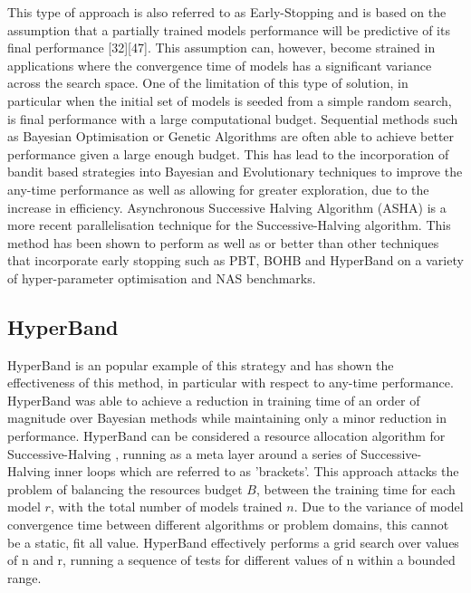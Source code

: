 \documentclass{article}
\begin{document}
		This type of approach is also referred to as Early-Stopping and is based on the assumption that a partially trained models performance will be predictive of its final performance [32][47]. This assumption can, however, become strained in applications where the convergence time of models has a significant variance across the search space. One of the limitation of this type of solution, in particular when the initial set of models is seeded from a simple random search, is final performance with a large computational budget.  Sequential methods such as Bayesian Optimisation or Genetic Algorithms are often able to achieve better performance given a large enough budget. This has lead to the incorporation of bandit based strategies into Bayesian and Evolutionary techniques to improve the any-time performance as well as allowing for greater exploration, due to the increase in efficiency. \cite{32,34,39}  Asynchronous Successive Halving Algorithm (ASHA) \cite{34} is a more recent parallelisation technique for the Successive-Halving algorithm. This method has been shown to perform as well as or better than other techniques that incorporate early stopping such as PBT, BOHB and HyperBand on a variety of hyper-parameter optimisation and NAS benchmarks.



	\subsection{HyperBand}

		HyperBand \cite{HB} is an popular example of this strategy and has shown the effectiveness of this method, in particular with respect to any-time performance. HyperBand was able to achieve a reduction in training time of an order of magnitude over Bayesian methods while maintaining only a minor reduction in performance. HyperBand can be considered a resource allocation algorithm for Successive-Halving \cite{SH}, running as a meta layer around a series of Successive-Halving inner loops which are referred to as 'brackets'. This approach attacks the problem of balancing the resources budget \(B\), between the training time for each model \(r\), with the total number of models trained \(n\). Due to the variance of model convergence time between different algorithms or problem domains, this cannot be a static, fit all value. HyperBand effectively performs a grid search over values of n and r, running a sequence of tests for different values of n within a bounded range. 
\end{document}
